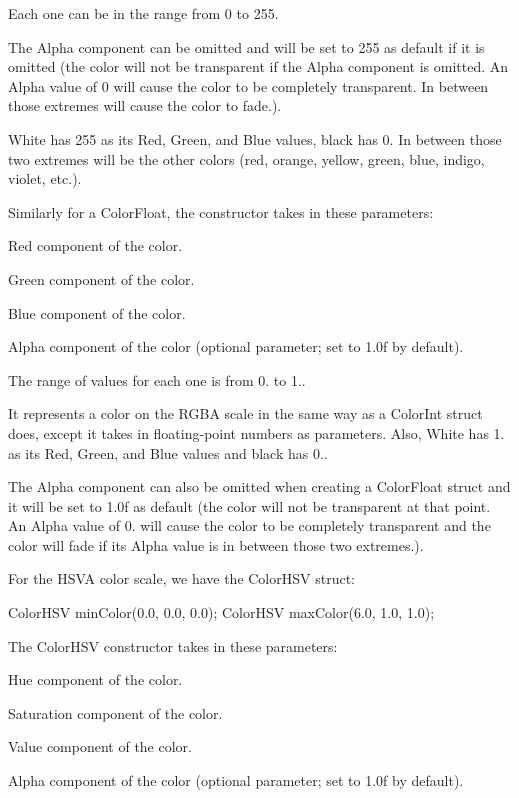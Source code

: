 Each one can be in the range from 0 to 255.

The Alpha component can be omitted and will be set to 255 as default if it is omitted (the color will not be transparent if the Alpha component is omitted. An Alpha value of 0 will cause the color to be completely transparent. In between those extremes will cause the color to fade.).

White has 255 as its Red, Green, and Blue values, black has 0. In between those two extremes will be the other colors (red, orange, yellow, green, blue, indigo, violet, etc.).

Similarly for a Color\+Float, the constructor takes in these parameters\+:


\begin{DoxyItemize}
\item Red component of the color.
\item Green component of the color.
\item Blue component of the color.
\item Alpha component of the color (optional parameter; set to 1.\+0f by default).
\end{DoxyItemize}

The range of values for each one is from 0. to 1..

It represents a color on the R\+G\+B\+A scale in the same way as a Color\+Int struct does, except it takes in floating-\/point numbers as parameters. Also, White has 1. as its Red, Green, and Blue values and black has 0..

The Alpha component can also be omitted when creating a Color\+Float struct and it will be set to 1.\+0f as default (the color will not be transparent at that point. An Alpha value of 0. will cause the color to be completely transparent and the color will fade if its Alpha value is in between those two extremes.).

For the H\+S\+V\+A color scale, we have the Color\+H\+S\+V struct\+:


\begin{DoxyCode}
ColorHSV minColor(0.0, 0.0, 0.0);
ColorHSV maxColor(6.0, 1.0, 1.0);
\end{DoxyCode}


The Color\+H\+S\+V constructor takes in these parameters\+:


\begin{DoxyItemize}
\item Hue component of the color.
\item Saturation component of the color.
\item Value component of the color.
\item Alpha component of the color (optional parameter; set to 1.\+0f by default).
\end{DoxyItemize}

